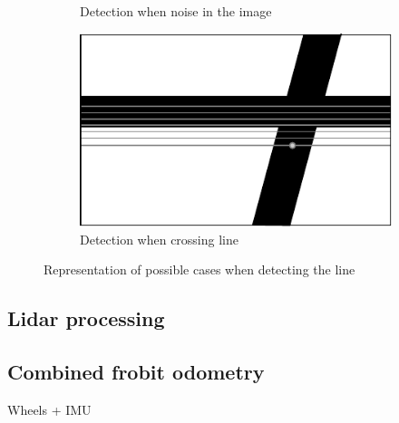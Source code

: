 \begin{figure}
\begin{subfigure}[ht!]{0.296\textwidth}
            \caption{Detection when noise in the image}
            \label{fig:mr_camera_processing_2}
    	\end{subfigure}
    	\begin{subfigure}[ht!]{0.296\textwidth}
            \includegraphics[width=\textwidth]{figs/mr_camera_processing_3}
            \caption{Detection when crossing line}
            \label{fig:mr_camera_processing_3}
    	\end{subfigure}
    \caption{Representation of possible cases when detecting the line}
    \end{figure}


	\subsection{Lidar processing} %
	\label{sub:mr_lidar_processing}
	

	\subsection{Combined frobit odometry} %
	\label{sub:mr_combined_frobit_odometry}
	Wheels + IMU
	

